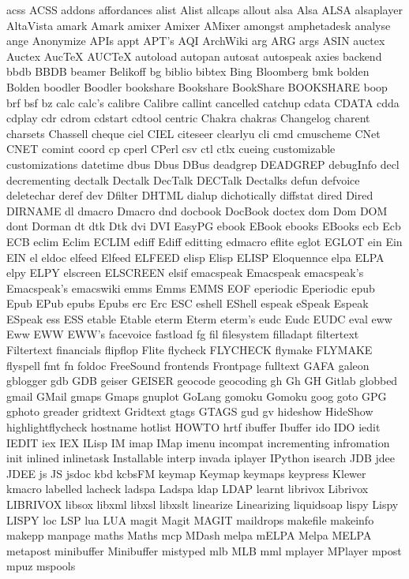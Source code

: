 acss
ACSS
addons
affordances
alist
Alist
allcaps
allout
alsa
Alsa
ALSA
alsaplayer
AltaVista
amark
Amark
amixer
Amixer
AMixer
amongst
amphetadesk
analyse
ange
Anonymize
APIs
appt
APT's
AQI
ArchWiki
arg
ARG
args
ASIN
auctex
Auctex
AucTeX
AUCTeX
autoload
autopan
autosat
autospeak
axies
backend
bbdb
BBDB
beamer
Belikoff
bg
biblio
bibtex
Bing
Bloomberg
bmk
bolden
Bolden
boodler
Boodler
bookshare
Bookshare
BookShare
BOOKSHARE
boop
brf
bsf
bz
calc
calc's
calibre
Calibre
callint
cancelled
catchup
cdata
CDATA
cdda
cdplay
cdr
cdrom
cdstart
cdtool
centric
Chakra
chakras
Changelog
charent
charsets
Chassell
cheque
ciel
CIEL
citeseer
clearlyu
cli
cmd
cmuscheme
CNet
CNET
comint
coord
cp
cperl
CPerl
csv
ctl
ctlx
cueing
customizable
customizations
datetime
dbus
Dbus
DBus
deadgrep
DEADGREP
debugInfo
decl
decrementing
dectalk
Dectalk
DecTalk
DECTalk
Dectalks
defun
defvoice
deletechar
deref
dev
Dfilter
DHTML
dialup
dichotically
diffstat
dired
Dired
DIRNAME
dl
dmacro
Dmacro
dnd
docbook
DocBook
doctex
dom
Dom
DOM
dont
Dorman
dt
dtk
Dtk
dvi
DVI
EasyPG
ebook
EBook
ebooks
EBooks
ecb
Ecb
ECB
eclim
Eclim
ECLIM
ediff
Ediff
editting
edmacro
eflite
eglot
EGLOT
ein
Ein
EIN
el
eldoc
elfeed
Elfeed
ELFEED
elisp
Elisp
ELISP
Eloquennce
elpa
ELPA
elpy
ELPY
elscreen
ELSCREEN
elsif
emacspeak
Emacspeak
emacspeak's
Emacspeak's
emacswiki
emms
Emms
EMMS
EOF
eperiodic
Eperiodic
epub
Epub
EPub
epubs
Epubs
erc
Erc
ESC
eshell
EShell
espeak
eSpeak
Espeak
ESpeak
ess
ESS
etable
Etable
eterm
Eterm
eterm's
eudc
Eudc
EUDC
eval
eww
Eww
EWW
EWW's
facevoice
fastload
fg
fil
filesystem
filladapt
filtertext
Filtertext
financials
flipflop
Flite
flycheck
FLYCHECK
flymake
FLYMAKE
flyspell
fmt
fn
foldoc
FreeSound
frontends
Frontpage
fulltext
GAFA
galeon
gblogger
gdb
GDB
geiser
GEISER
geocode
geocoding
gh
Gh
GH
Gitlab
globbed
gmail
GMail
gmaps
Gmaps
gnuplot
GoLang
gomoku
Gomoku
goog
goto
GPG
gphoto
greader
gridtext
Gridtext
gtags
GTAGS
gud
gv
hideshow
HideShow
highlightflycheck
hostname
hotlist
HOWTO
hrtf
ibuffer
Ibuffer
ido
IDO
iedit
IEDIT
iex
IEX
ILisp
IM
imap
IMap
imenu
incompat
incrementing
infromation
init
inlined
inlinetask
Installable
interp
invada
iplayer
IPython
isearch
JDB
jdee
JDEE
js
JS
jsdoc
kbd
kcbsFM
keymap
Keymap
keymaps
keypress
Klewer
kmacro
labelled
lacheck
ladspa
Ladspa
ldap
LDAP
learnt
librivox
Librivox
LIBRIVOX
libsox
libxml
libxsl
libxslt
linearize
Linearizing
liquidsoap
lispy
Lispy
LISPY
loc
LSP
lua
LUA
magit
Magit
MAGIT
maildrops
makefile
makeinfo
makepp
manpage
maths
Maths
mcp
MDash
melpa
mELPA
Melpa
MELPA
metapost
minibuffer
Minibuffer
mistyped
mlb
MLB
mml
mplayer
MPlayer
mpost
mpuz
mspools

